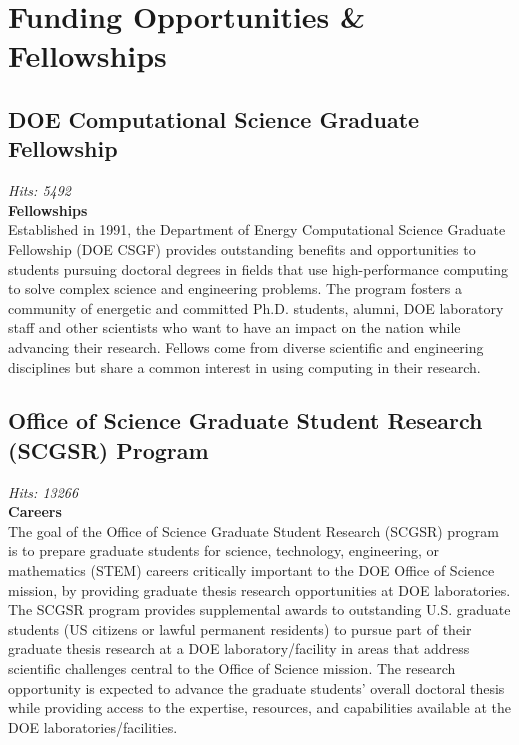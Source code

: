 \documentclass[12pt,a4paper]{article}
\begin{document}
\section{Funding Opportunities \& Fellowships}

\subsection{DOE Computational Science Graduate Fellowship}
\textit{Hits: 5492} \\
\textbf{Fellowships} \\
Established in 1991, the Department of Energy Computational Science Graduate Fellowship (DOE CSGF) provides outstanding benefits and opportunities to students pursuing doctoral degrees in fields that use high-performance computing to solve complex science and engineering problems. The program fosters a community of energetic and committed Ph.D. students, alumni, DOE laboratory staff and other scientists who want to have an impact on the nation while advancing their research. Fellows come from diverse scientific and engineering disciplines but share a common interest in using computing in their research.

\subsection{Office of Science Graduate Student Research (SCGSR) Program}
\textit{Hits: 13266} \\
\textbf{Careers} \\
The goal of the Office of Science Graduate Student Research (SCGSR) program is to prepare graduate students for science, technology, engineering, or mathematics (STEM) careers critically important to the DOE Office of Science mission, by providing graduate thesis research opportunities at DOE laboratories. The SCGSR program provides supplemental awards to outstanding U.S. graduate students (US citizens or lawful permanent residents) to pursue part of their graduate thesis research at a DOE laboratory/facility in areas that address scientific challenges central to the Office of Science mission. The research opportunity is expected to advance the graduate students’ overall doctoral thesis while providing access to the expertise, resources, and capabilities available at the DOE laboratories/facilities.
\end{document}
